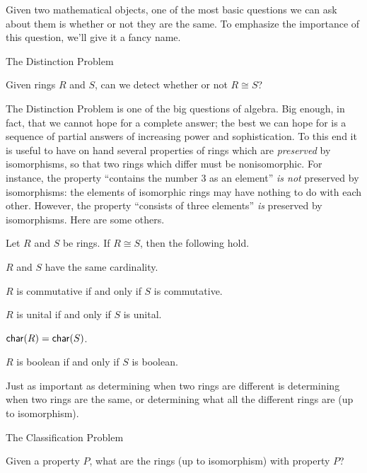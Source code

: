 Given two mathematical objects, one of the most basic questions we can ask about them is whether or not they are the same.
To emphasize the importance of this question, we'll give it a fancy name.

\begin{titlebox}{The Distinction Problem}
\begin{center}
Given rings \(R\) and \(S\), can we detect whether or not \(R \cong S\)?
\end{center}
\end{titlebox}

The Distinction Problem is one of the big questions of algebra.
Big enough, in fact, that we cannot hope for a complete answer; the best we can hope for is a sequence of partial answers of increasing power and sophistication.
To this end it is useful to have on hand several properties of rings which are \emph{preserved} by isomorphisms, so that two rings which differ must be nonisomorphic.
For instance, the property ``contains the number 3 as an element'' \emph{is not} preserved by isomorphisms: the elements of isomorphic rings may have nothing to do with each other.
However, the property ``consists of three elements'' \emph{is} preserved by isomorphisms.
Here are some others.

\begin{prop} \label{prop:iso-preserved-props}
Let \(R\) and \(S\) be rings.
If \(R \cong S\), then the following hold.
\begin{proplist*}
\item \(R\) and \(S\) have the same cardinality.
\item \(R\) is commutative if and only if \(S\) is commutative.
\item \(R\) is unital if and only if \(S\) is unital.
\item \(\mathsf{char}(R) = \mathsf{char}(S)\).
\item \(R\) is boolean if and only if \(S\) is boolean.
\end{proplist*}
\end{prop}

Just as important as determining when two rings are different is determining when two rings are the same, or determining what all the different rings are (up to isomorphism).

\begin{titlebox}{The Classification Problem}
\begin{center}
Given a property \(P\), what are the rings (up to isomorphism) with property \(P\)?
\end{center}
\end{titlebox}

